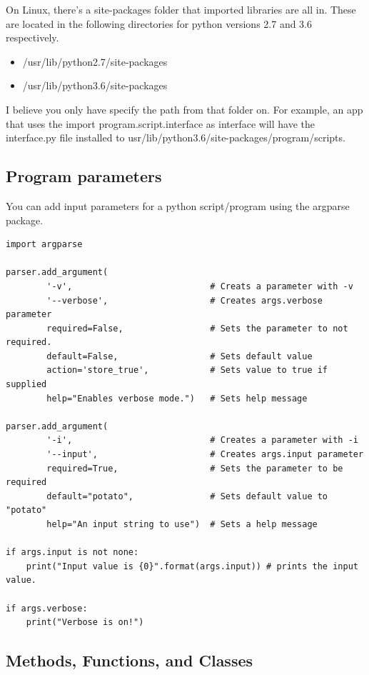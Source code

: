 On Linux, there's a site-packages folder that imported libraries are all in. These are located in the following directories for python versions 2.7 and 3.6 respectively.

\begin{itemize}
	\item /usr/lib/python2.7/site-packages
	\item /usr/lib/python3.6/site-packages
\end{itemize}

I believe you only have specify the path from that folder on. For example, an app that uses the import program.script.interface as interface will have the interface.py file installed to usr/lib/python3.6/site-packages/program/scripts.









\subsection{Program parameters}

You can add input parameters for a python script/program using the argparse package.
\begin{lstlisting}
import argparse

parser.add_argument(
		'-v',							# Creats a parameter with -v
		'--verbose',					# Creates args.verbose parameter
		required=False,					# Sets the parameter to not required.
		default=False,					# Sets default value
		action='store_true',			# Sets value to true if supplied
		help="Enables verbose mode.")	# Sets help message
					
parser.add_argument(
		'-i',							# Creates a parameter with -i
		'--input',						# Creates args.input parameter
		required=True,					# Sets the parameter to be required
		default="potato",				# Sets default value to "potato"
		help="An input string to use")	# Sets a help message
		
if args.input is not none:
	print("Input value is {0}".format(args.input)) # prints the input value.
	
if args.verbose:
	print("Verbose is on!")
\end{lstlisting}





\subsection{Methods, Functions, and Classes}


